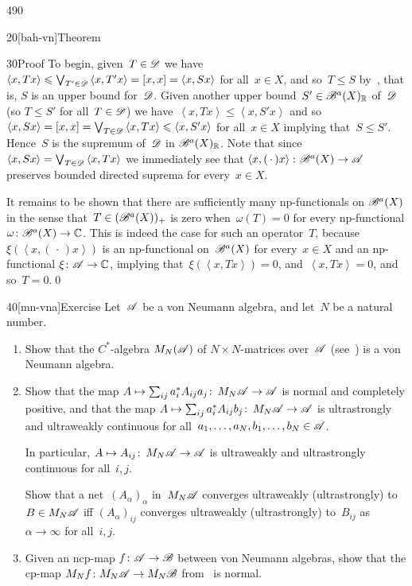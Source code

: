 \begin{parsec}{490}
\begin{point}{20}[bah-vn]{Theorem}
\begin{point}{30}{Proof}
To begin,
given~$T\in\mathscr{D}$
we have~$\left<x,Tx\right>\leqslant\bigvee_{T'\in\mathscr{D}} \left<x,T'x\right>
=[x,x]=\left<x,Sx\right>$
for all~$x\in X$,
and so~$T\leq S$
by~,
that is, $S$ is an upper bound for~$\mathscr{D}$.
Given another upper bound~$S'\in\mathscr{B}^a(X)_{\mathbb{R}}$
of~$\mathscr{D}$
(so  $T\leq S'$ for all~$T\in\mathscr{D}$)
we have~$\left<x,Tx\right>\leq \left<x,S'x\right>$
and so~$\left<x,Sx\right>
=[x,x]=\bigvee_{T\in \mathscr{D}}\left<x,Tx\right>\leqslant \left<x,S'x\right>$
for all~$x\in X$
implying that~$S\leq S'$.
Hence~$S$ is the supremum of~$\mathscr{D}$
in $\mathscr{B}^a(X)_{\mathbb{R}}$.
Note that since~$\left<x,Sx\right>=\bigvee_{T\in\mathscr{D}} \left<x,Tx\right>$
we immediately see
that $\left<x,(\,\cdot\,)x\right>\colon \mathscr{B}^a(X)\to\mathscr{A}$
preserves bounded directed suprema
for every~$x\in X$.

It remains to be shown that
there are sufficiently many np-functionals on $\mathscr{B}^a(X)$
in the sense that~$T\in(\mathscr{B}^a(X))_+$ is zero
when~$\omega(T)=0$ for every np-functional $\omega\colon \mathscr{B}^a(X)\to\mathbb{C}$.
This is indeed
the case for such an operator~$T$,
because~$\xi(\left<x,(\,\cdot\,)x\right>)$
is an np-functional on~$\mathscr{B}^a(X)$
for every~$x\in X$
and an np-functional $\xi\colon \mathscr{A}\to\mathbb{C}$,
implying that~$\xi(\left<x,Tx\right>)=0$,
and~$\left<x,Tx\right>=0$,
and so~$T=0$.\qed
\end{point}
\end{point}
\begin{point}{40}[mn-vna]{Exercise}%
%
Let~$\mathscr{A}$ be a von Neumann algebra,
and let~$N$ be a natural number.
\begin{enumerate}
\item
Show 
that the $C^*$-algebra
$M_N(\mathscr{A})$ of $N\times N$-matrices over~$\mathscr{A}$ (see~)
is a von Neumann algebra.
\item
Show that
the map $A\mapsto \sum_{ij} a_i^* A_{ij} a_j\colon\, M_N\mathscr{A}\to \mathscr{A}$
is normal and completely positive,
and that
the map $A\mapsto \sum_{ij} a_i^* A_{ij} b_j\colon\, M_N\mathscr{A}\to\mathscr{A}$
is ultrastrongly and ultraweakly continuous
for all~$a_1,\dotsc,a_N,b_1,\dotsc,b_N\in\mathscr{A}$.

In particular, $A\mapsto A_{ij}\colon\,M_N\mathscr{A}\to\mathscr{A}$
is ultraweakly and ultrastrongly continuous
for all~$i,j$.

Show that a net~$(A_\alpha)_\alpha$
in~$M_N\mathscr{A}$
converges ultraweakly (ultrastrongly)
to $B\in M_N\mathscr{A}$
iff $(A_\alpha)_{ij}$ converges ultraweakly (ultrastrongly)
to~$B_{ij}$ as~$\alpha\to\infty$ for all~$i,j$.
\item
Given an ncp-map $f\colon \mathscr{A}\to\mathscr{B}$
between von Neumann algebras,
show that the cp-map $M_N f\colon M_N\mathscr{A}\to M_N\mathscr{B}$
from~ is normal.%
\end{enumerate}
\spacingfix%
\end{point}%
\end{parsec}%
